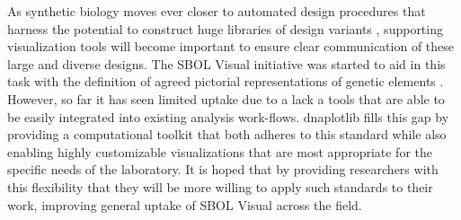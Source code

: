 \documentclass{bioinfo}
\begin{document}
As synthetic biology moves ever closer to automated design procedures that harness the potential to construct huge libraries of design variants \citep{Smanski14a,Bilitchenko11a}, supporting visualization tools will become important to ensure clear communication of these large and diverse designs. The SBOL Visual initiative was started to aid in this task with the definition of agreed pictorial representations of genetic elements \citep{Quinn13a}. However, so far it has seen limited uptake due to a lack a tools that are able to be easily integrated into existing analysis work-flows. dnaplotlib fills this gap by providing a computational toolkit that both adheres to this standard while also enabling highly customizable visualizations that are most appropriate for the specific needs of the laboratory. It is hoped that by providing researchers with this flexibility that they will be more willing to apply such standards to their work, improving general uptake of SBOL Visual across the field.
\end{document}
